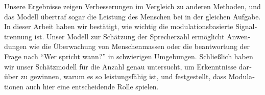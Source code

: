\begin{otherlanguage}{ngerman}
Unsere Ergebnisse zeigen Verbesserungen im Vergleich zu anderen Methoden, und das Modell übertraf sogar die Leistung des Menschen bei in der gleichen Aufgabe.
In dieser Arbeit haben wir bestätigt, wie wichtig die modulationsbasierte Signaltrennung ist. 
Unser Modell zur Schätzung der Sprecherzahl ermöglicht Anwendungen wie die Überwachung von Menschenmassen oder die beantwortung der Frage nach ``Wer spricht wann?'' in schwierigen Umgebungen.
Schließlich haben wir unser Schätzmodell für die Anzahl genau untersucht, um Erkenntnisse darüber zu gewinnen, warum es so leistungsfähig ist, und festgestellt, dass Modulationen auch hier eine entscheidende Rolle spielen.
\end{otherlanguage}

\endgroup

\vfill
